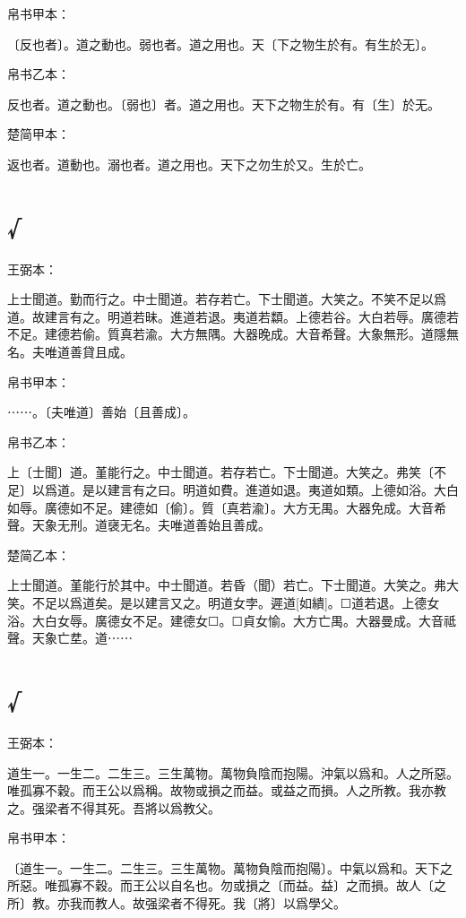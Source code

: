 \documentclass[a5paper]{ctexbook}
\begin{document}
    
    帛书甲本：

    〔反也者〕。道之動也。弱也者。道之用也。天〔下之物生於有。有生於无〕。

    帛书乙本：

    反也者。道之動也。〔弱也〕者。道之用也。天下之物生於有。有〔生〕於无。

    楚简甲本：

    返也者。道動也。溺也者。道之用也。天下之勿生於又。生於亡。

    \chapter{√}
    王弼本：

    上士聞道。勤而行之。中士聞道。若存若亡。下士聞道。大笑之。不笑不足以爲道。故建言有之。明道若昧。進道若退。夷道若纇。上德若谷。大白若辱。廣德若不足。建德若偷。質真若渝。大方無隅。大器晚成。大音希聲。大象無形。道隱無名。夫唯道善貸且成。

    
    帛书甲本：

    ⋯⋯。〔夫唯道〕善始〔且善成〕。

    帛书乙本：

    上〔士聞〕道。堇能行之。中士聞道。若存若亡。下士聞道。大笑之。弗笑〔不足〕以爲道。是以建言有之曰。明道如費。進道如退。夷道如類。上德如浴。大白如辱。廣德如不足。建德如〔偷〕。質〔真若渝〕。大方无禺。大器免成。大音希聲。天象无刑。道襃无名。夫唯道善始且善成。

    楚简乙本：

    上士聞道。堇能行於其中。中士聞道。若昏（聞）若亡。下士聞道。大笑之。弗大笑。不足以爲道矣。是以建言又之。明道女孛。遲道[如繢]。☐道若退。上德女浴。大白女辱。廣德女不足。建德女☐。☐貞女愉。大方亡禺。大器曼成。大音祗聲。天象亡坓。道⋯⋯

    \chapter{√}
    王弼本：

    道生一。一生二。二生三。三生萬物。萬物負陰而抱陽。沖氣以爲和。人之所惡。唯孤寡不穀。而王公以爲稱。故物或損之而益。或益之而損。人之所教。我亦教之。强梁者不得其死。吾將以爲教父。

    
    帛书甲本：

    〔道生一。一生二。二生三。三生萬物。萬物負陰而抱陽〕。中氣以爲和。天下之所惡。唯孤寡不穀。而王公以自名也。勿或損之〔而益。益〕之而損。故人〔之所〕教。亦我而教人。故强梁者不得死。我〔將〕以爲學父。
\end{document}
